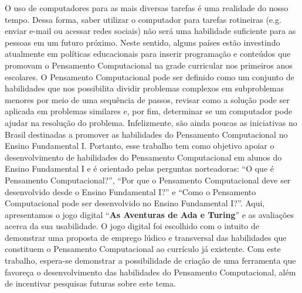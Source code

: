 O uso de computadores para as mais diversas tarefas é uma realidade do nosso tempo. Dessa forma, saber utilizar o computador para tarefas rotineiras (e.g. enviar e-mail ou acessar redes sociais) não será uma habilidade suficiente para as pessoas em um futuro próximo. Neste sentido, alguns países estão investindo atualmente em políticas educacionais para inserir programação e conteúdos que promovam o Pensamento Computacional na grade curricular nos primeiros anos escolares. O Pensamento Computacional pode ser definido como um conjunto de habilidades que nos possibilita dividir problemas complexos em subproblemas menores por meio de uma sequência de passos, revisar como a solução pode ser aplicada em problemas similares e, por fim, determinar se um computador pode ajudar na resolução do problema. Infelizmente, são ainda poucas as iniciativas no Brasil destinadas a promover as habilidades do Pensamento Computacional  no Ensino Fundamental I. Portanto, esse trabalho tem como objetivo apoiar o desenvolvimento de habilidades do Pensamento Computacional em alunos do Ensino Fundamental I e é orientado pelas perguntas norteadoras: “O que é Pensamento Computacional?”, “Por que o Pensamento Computacional deve ser desenvolvido desde o Ensino Fundamental I?” e  “Como o Pensamento Computacional pode ser desenvolvido no Ensino Fundamental I?”. Aqui, apresentamos o jogo digital “\textbf{As Aventuras de Ada e Turing}” e as avaliações acerca da sua usabilidade. O jogo digital foi escolhido com o intuito de demonstrar uma proposta de emprego lúdico e transversal das habilidades que constituem o Pensamento Computacional ao currículo já existente. Com este trabalho, espera-se demonstrar a possibilidade de criação de uma ferramenta que favoreça o desenvolvimento das habilidades do Pensamento Computacional, além de incentivar pesquisas futuras sobre este tema.